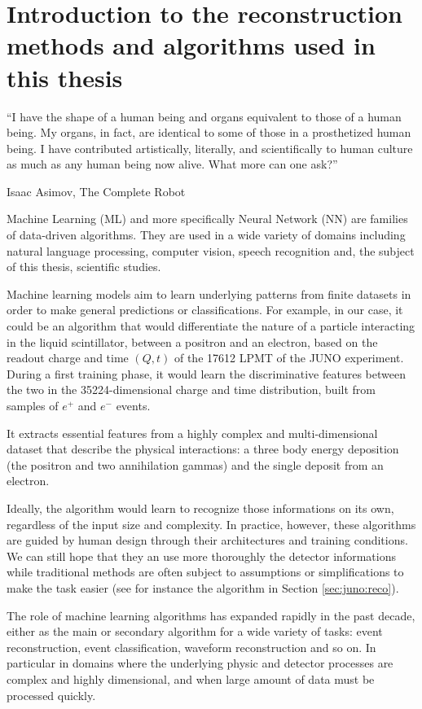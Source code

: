 \documentclass[../main.tex]{subfiles}
\begin{document}
\chapter{Introduction to the reconstruction methods and algorithms used in this thesis}
\label{sec:ml}

\epigraph{``I have the shape of a human being and organs equivalent to those of a human being. My organs, in fact, are identical to some of those in a prosthetized human being. I have contributed artistically, literally, and scientifically to human culture as much as any human being now alive. What more can one ask?''}{Isaac Asimov, The Complete Robot}

\minitoc

Machine Learning (ML) and more specifically Neural Network (NN) are families of data-driven algorithms. They are used in a wide variety of domains including natural language processing, computer vision, speech recognition and, the subject of this thesis, scientific studies.

Machine learning models aim to learn underlying patterns from finite datasets in order to make general predictions or classifications.
For example, in our case, it could be an algorithm that would differentiate the nature of a particle interacting in the liquid scintillator, between a positron and an electron, based on the readout charge and time $(Q, t)$ of the 17612 LPMT of the JUNO experiment. During a first training phase, it would learn the discriminative features between the two in the 35224-dimensional charge and time distribution, built from samples of $e^+$ and $e^-$ events.

It extracts essential features from a highly complex and multi-dimensional dataset that describe the physical interactions: a three body energy deposition (the positron and two annihilation gammas) and the single deposit from an electron.

Ideally, the algorithm would learn to recognize those informations on its own, regardless of the input size and complexity. In practice, however, these algorithms are guided by human design through their architectures and training conditions. We can still hope that they an use more thoroughly the detector informations while traditional methods are often subject to assumptions or simplifications to make the task easier (see for instance the algorithm in Section \ref{sec:juno:reco}).

The role of machine learning algorithms has expanded rapidly in the past decade, either as the main or secondary algorithm for a wide variety of tasks: event reconstruction, event classification, waveform reconstruction and so on. In particular in domains where the underlying physic and detector processes are complex and highly dimensional, and when large amount of data must be processed quickly.
\end{document}
